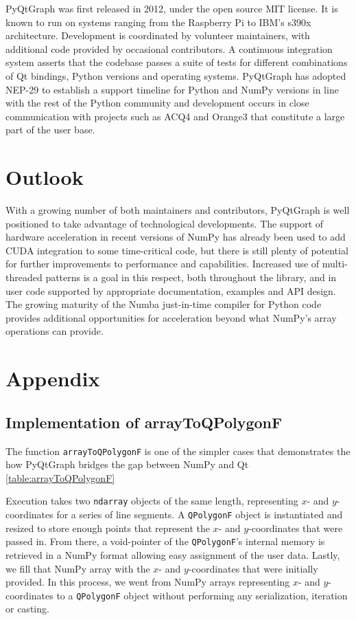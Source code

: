 PyQtGraph was first released in 2012, under the open source MIT license. It is known to run on systems ranging from the Raspberry Pi to IBM's s390x architecture. Development is coordinated by volunteer maintainers, with additional code provided by occasional contributors. A continuous integration system asserts that the codebase passes a suite of tests for different combinations of Qt bindings, Python versions and operating systems. PyQtGraph has adopted NEP-29 \citep{NEP-29} to establish a support timeline for Python and NumPy versions in line with the rest of the Python community and development occurs in close communication with projects such as ACQ4 \citep{10.3389/fninf.2014.00003} and Orange3 \citep{JMLR:demsar13a} that constitute a large part of the user base.

\section{Outlook}
With a growing number of both maintainers and contributors, PyQtGraph is well positioned to take advantage of technological developments. The support of hardware acceleration in recent versions of NumPy has already been used to add CUDA integration to some time-critical code, but there is still plenty of potential for further improvements to performance and capabilities. Increased use of multi-threaded patterns is a goal in this respect, both throughout the library, and in user code supported by appropriate documentation, examples and API design. The growing maturity of the Numba just-in-time compiler \citep{lam2015numba} for Python code provides additional opportunities for acceleration beyond what NumPy's array operations can provide.


\section{Appendix}

\subsection{Implementation of arrayToQPolygonF}
\label{app_qpolygon}
The function \texttt{arrayToQPolygonF} is one of the simpler cases that demonstrates the how PyQtGraph bridges the gap between NumPy and Qt  \autoref{table:arrayToQPolygonF}

Execution takes two \texttt{ndarray} objects of the same length, representing $x$- and $y$-coordinates for a series of line segments. A \texttt{QPolygonF} object is instantiated and resized to store enough points that represent the $x$- and $y$-coordinates that were passed in. From there, a void-pointer of the \texttt{QPolygonF}'s internal memory is retrieved in a NumPy format allowing easy assignment of the user data. Lastly, we fill that NumPy array with the $x$- and $y$-coordinates that were initially provided.  In this process, we went from NumPy arrays representing $x$- and $y$- coordinates to a \texttt{QPolygonF} object without performing any serialization, iteration or casting.

